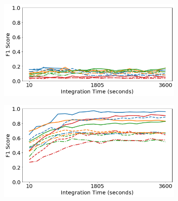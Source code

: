 \begin{figure}[H]
     \centering
     \begin{subfigure}[b]{0.49\textwidth}
         \centering
         \includegraphics[width=\textwidth]{images/generalization-shielding-easy-01.png}
         \caption{}
         \label{fig:generalization-shielding-easy-01}
     \end{subfigure}
     \hfill
     \begin{subfigure}[b]{0.49\textwidth}
         \centering
         \includegraphics[width=\textwidth]{images/generalization-shielding-easy-05.png}
         \caption{}
         \label{fig:generalization-shielding-easy-05}
     \end{subfigure}


\end{figure}
